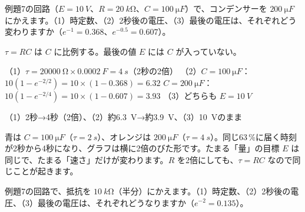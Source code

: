 \begin{reidai}[$C$ を2倍にすると]
例題7の回路（$E=\qty{10}{V}$、$R=\qty{20}{k\ohm}$、$C=\qty{100}{\micro F}$）で、コンデンサーを $\qty{200}{\micro F}$ にかえます。（1）時定数、（2）2秒後の電圧、（3）最後の電圧は、それぞれどう変わりますか（$e^{-1}=0.368$、$e^{-0.5}=0.607$）。\par
\kangaekata $\tau=RC$ は $C$ に比例する。最後の値 $E$ には $C$ が入っていない。\par
\shiki（1）$\tau=\qty{20000}{\ohm}\times\qty{0.0002}{F}=\qty{4}{s}$（2秒の2倍）\bkvieq
（2）$C=\qty{100}{\micro F}$：$10(1-e^{-2/2})=10\times(1-0.368)=6.32$\bkvieq
\hspace*{2.2\zw}$C=\qty{200}{\micro F}$：$10(1-e^{-2/4})=10\times(1-0.607)=3.93$\bkvieq
（3）どちらも $E=\qty{10}{V}$\par
\kotae（1）2秒→4秒（2倍）、（2）約\qty{6.3}{V}→約\qty{3.9}{V}、（3）\qty{10}{V}のまま
\end{reidai}
\noindent\begin{minipage}[c]{0.5\linewidth}
\end{minipage}\hfill
\begin{minipage}[c]{0.46\linewidth}\raggedright
青は $C=\qty{100}{\micro F}$（$\tau=\qty{2}{s}$）、オレンジは $\qty{200}{\micro F}$（$\tau=\qty{4}{s}$）。同じ63\,\%に届く時刻が2秒から4秒になり、グラフは横に2倍のびた形です。たまる「量」の目標 $E$ は同じで、たまる「速さ」だけが変わります。$R$ を2倍にしても、$\tau=RC$ なので同じことが起きます。
\end{minipage}
\par\vspace{4pt}

\begin{jibun}
例題7の回路で、抵抗を $\qty{10}{k\ohm}$（半分）にかえます。（1）時定数、（2）2秒後の電圧、（3）最後の電圧は、それぞれどうなりますか（$e^{-2}=0.135$）。
\end{jibun}

